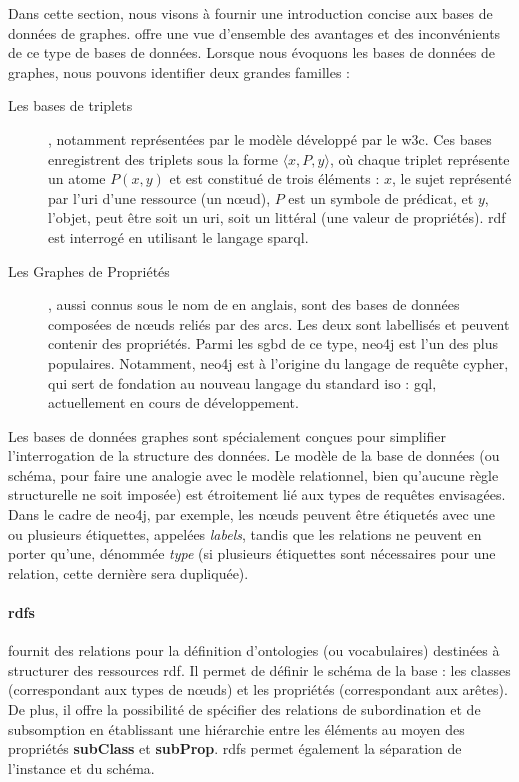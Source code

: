 Dans cette section, nous visons à fournir une introduction concise aux bases de données de graphes.
\cite{pokornyGraphDatabasesTheir2015} offre une vue d'ensemble des avantages et des inconvénients de ce type de bases de données.
Lorsque nous évoquons les bases de données de graphes, nous pouvons identifier deux grandes familles :
\begin{description}
    \item[Les bases de triplets], notamment représentées par le modèle  développé par le \gls{w3c}.
    Ces bases enregistrent des triplets sous la forme $\langle x, P, y \rangle$, où chaque triplet représente un atome $P(x, y)$ et est constitué de trois éléments : $x$, le sujet représenté par l'\gls{uri} d'une ressource (un nœud), $P$ est un symbole de prédicat, et $y$, l'objet, peut être soit un \gls{uri}, soit un littéral (une valeur de propriétés).
    \gls{rdf} est interrogé en utilisant le langage \gls{sparql}.
    
    \item[Les Graphes de Propriétés], aussi connus sous le nom de  en anglais, sont des bases de données composées de nœuds reliés par des arcs. Les deux sont labellisés et peuvent contenir des propriétés.
    Parmi les \gls{sgbd} de ce type, \gls{neo4j} est l'un des plus populaires.
    Notamment, \gls{neo4j} est à l'origine du langage de requête \gls{cypher}, qui sert de fondation au nouveau langage du standard \gls{iso} : \gls{gql}, actuellement en cours de développement.
\end{description}

Les bases de données graphes sont spécialement conçues pour simplifier l'interrogation de la structure des données.
Le modèle de la base de données (ou schéma, pour faire une analogie avec le modèle relationnel, bien qu'aucune règle structurelle ne soit imposée) est étroitement lié aux types de requêtes envisagées.
Dans le cadre de \gls{neo4j}, par exemple, les nœuds peuvent être étiquetés avec une ou plusieurs étiquettes, appelées \emph{labels}, tandis que les relations ne peuvent en porter qu'une, dénommée \emph{type} (si plusieurs étiquettes sont nécessaires pour une relation, cette dernière sera dupliquée).

\paragraph{\acs{rdfs}}
fournit des relations pour la définition d'ontologies (ou vocabulaires) destinées à structurer des ressources \gls{rdf}.
Il permet de définir le schéma de la base : les classes (correspondant aux types de nœuds) et les propriétés (correspondant aux arêtes).
De plus, il offre la possibilité de spécifier des relations de subordination et de subsomption en établissant une hiérarchie entre les éléments au moyen des propriétés \textbf{subClass} et \textbf{subProp}.
\gls{rdfs} permet également la séparation de l'instance et du schéma.


